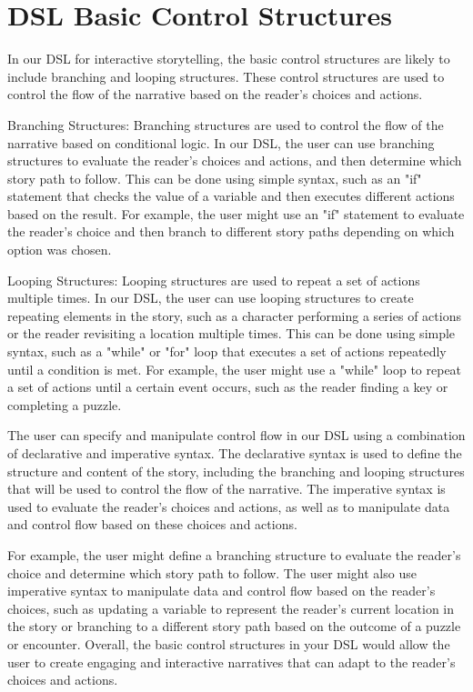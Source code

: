 \section{DSL Basic Control Structures}

In our DSL for interactive storytelling, the basic control structures are likely to include branching and looping structures. These control structures are used to control the flow of the narrative based on the reader's choices and actions.

Branching Structures: Branching structures are used to control the flow of the narrative based on conditional logic. In our DSL, the user can use branching structures to evaluate the reader's choices and actions, and then determine which story path to follow. This can be done using simple syntax, such as an "if" statement that checks the value of a variable and then executes different actions based on the result. For example, the user might use an "if" statement to evaluate the reader's choice and then branch to different story paths depending on which option was chosen.

Looping Structures: Looping structures are used to repeat a set of actions multiple times. In our DSL, the user can use looping structures to create repeating elements in the story, such as a character performing a series of actions or the reader revisiting a location multiple times. This can be done using simple syntax, such as a "while" or "for" loop that executes a set of actions repeatedly until a condition is met. For example, the user might use a "while" loop to repeat a set of actions until a certain event occurs, such as the reader finding a key or completing a puzzle.

The user can specify and manipulate control flow in our DSL using a combination of declarative and imperative syntax. The declarative syntax is used to define the structure and content of the story, including the branching and looping structures that will be used to control the flow of the narrative. The imperative syntax is used to evaluate the reader's choices and actions, as well as to manipulate data and control flow based on these choices and actions.

For example, the user might define a branching structure to evaluate the reader's choice and determine which story path to follow. The user might also use imperative syntax to manipulate data and control flow based on the reader's choices, such as updating a variable to represent the reader's current location in the story or branching to a different story path based on the outcome of a puzzle or encounter. Overall, the basic control structures in your DSL would allow the user to create engaging and interactive narratives that can adapt to the reader's choices and actions.

